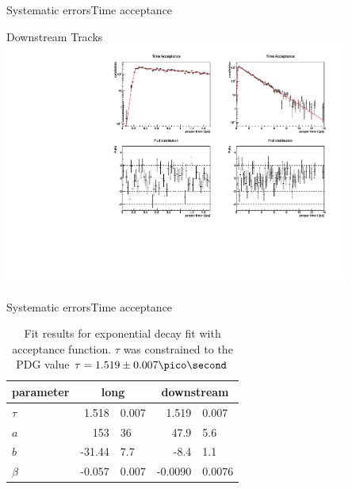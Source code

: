 \documentclass{beamer}
\begin{document}
\begin{frame}{Systematic errors}{Time acceptance}
\begin{block}{Downstream Tracks}
\centering
\includegraphics[width=0.85\textwidth]{time_acceptance_fit_ds}
\end{block}
\end{frame}

\begin{frame}{Systematic errors}{Time acceptance}
\begin{table}
\caption{Fit results for exponential decay fit with acceptance function. $\tau$ was constrained to the PDG value $\tau = 1.519 \pm 0.007 \pico\second$}
\begin{tabular}{lr@{$\pm$}l r@{$\pm$}l}
\hline \hline 
parameter & \multicolumn{2}{c}{long} & \multicolumn{2}{c}{downstream} \\ \hline
$\tau$    & 1.518 & 0.007 & 1.519 & 0.007 \\
$a$       & 153 & 36 & 47.9 & 5.6 \\
$b$       & -31.44 & 7.7 & -8.4 & 1.1 \\
$\beta$   & -0.057 & 0.007 &  -0.0090 & 0.0076 \\ 
\hline \hline
\end{tabular}
\end{table}
\end{frame}
\end{document}
